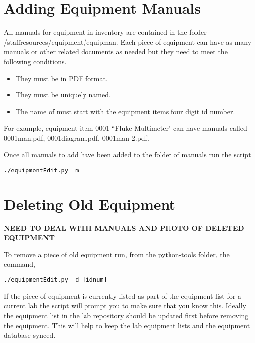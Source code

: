 \documentclass[justified]{LabArx3_5_1}
\begin{document}
\section{Adding Equipment Manuals}\label{sec:invManuals}

All manuals for equipment in inventory are contained in the folder /staffresources/equipment/equipman. Each piece of equipment can have as many manuals or other related documents as needed but they need to meet the following conditions.

\begin{itemize}
\item They must be in PDF format.
\item They must be uniquely named.
\item The name of must start with the equipment items four digit id number.

\end{itemize}

For example, equipment item 0001 ``Fluke Multimeter" can have manuals called 0001man.pdf, 0001diagram.pdf, 0001man-2.pdf. 

Once all manuals to add have been added to the folder of manuals run the script

\begin{lstlisting}
./equipmentEdit.py -m
\end{lstlisting}

\section{Deleting Old Equipment}\label{sec:invDelete}

{\bf NEED TO DEAL WITH MANUALS AND PHOTO OF DELETED EQUIPMENT}

To remove a piece of old equipment run, from the python-tools folder, the command,


\begin{lstlisting}
./equipmentEdit.py -d [idnum]       
\end{lstlisting}

If the piece of equipment is currently listed as part of the equipment list for a current lab the script will prompt you to make sure that you know this. Ideally the equipment list in the lab repository should be updated first before removing the equipment. This will help to keep the lab equipment lists and the equipment database synced. 
\end{document}
